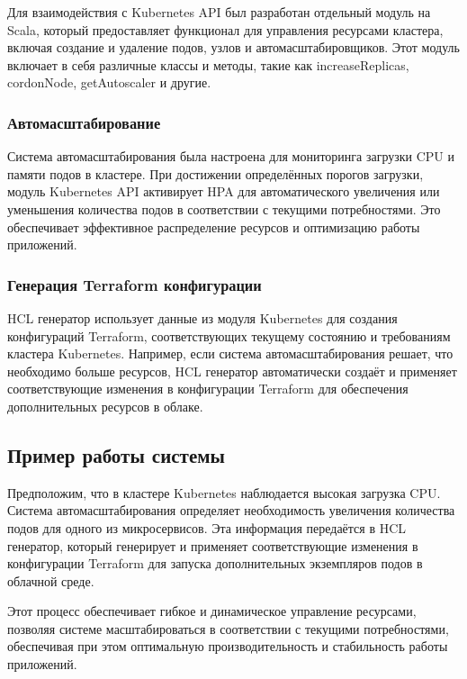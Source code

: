 Для взаимодействия с Kubernetes API был разработан отдельный модуль на Scala,
который предоставляет функционал для управления ресурсами кластера, включая
создание и удаление подов, узлов и автомасштабировщиков. Этот модуль включает в
себя различные классы и методы, такие как increaseReplicas, cordonNode,
getAutoscaler и другие.

\subsubsection{Автомасштабирование}

Система автомасштабирования была настроена для мониторинга загрузки CPU и памяти
подов в кластере. При достижении определённых порогов загрузки, модуль
Kubernetes API активирует HPA для автоматического увеличения или уменьшения
количества подов в соответствии с текущими потребностями. Это обеспечивает
эффективное распределение ресурсов и оптимизацию работы приложений.

\subsubsection{Генерация Terraform конфигурации}

HCL генератор использует данные из модуля Kubernetes для создания конфигураций
Terraform, соответствующих текущему состоянию и требованиям кластера Kubernetes.
Например, если система автомасштабирования решает, что необходимо больше
ресурсов, HCL генератор автоматически создаёт и применяет соответствующие
изменения в конфигурации Terraform для обеспечения дополнительных ресурсов в
облаке.

\subsection{Пример работы системы}

Предположим, что в кластере Kubernetes наблюдается высокая загрузка CPU. Система
автомасштабирования определяет необходимость увеличения количества подов для
одного из микросервисов. Эта информация передаётся в HCL генератор, который
генерирует и применяет соответствующие изменения в конфигурации Terraform для
запуска дополнительных экземпляров подов в облачной среде.

Этот процесс обеспечивает гибкое и динамическое управление ресурсами, позволяя
системе масштабироваться в соответствии с текущими потребностями, обеспечивая
при этом оптимальную производительность и стабильность работы приложений.

